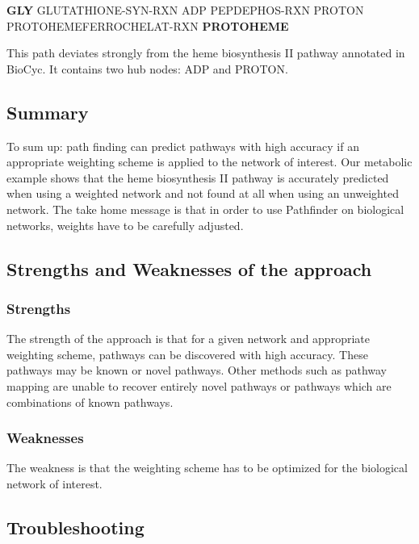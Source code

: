\textbf{GLY} GLUTATHIONE-SYN-RXN ADP PEPDEPHOS-RXN PROTON PROTOHEMEFERROCHELAT-RXN \textbf{PROTOHEME}

This path deviates strongly from the heme biosynthesis II pathway annotated in BioCyc. It contains two hub nodes: ADP and PROTON.

\subsection{Summary}

To sum up: path finding can predict pathways with high accuracy if an appropriate weighting scheme is applied to the network of interest. Our metabolic example shows that the heme biosynthesis II pathway is accurately predicted when using a weighted network and not found at all when using an unweighted network. The take home message is that in order to use Pathfinder on biological networks, weights have to be carefully adjusted.

\subsection{Strengths and Weaknesses of the approach}

\subsubsection{Strengths}
The strength of the approach is that for a given network and appropriate weighting scheme, pathways can be discovered with high accuracy. These pathways may be known or novel pathways. Other methods such as pathway mapping
are unable to recover entirely novel pathways or pathways which are combinations of known pathways.

\subsubsection{Weaknesses}
The weakness is that the weighting scheme has to be optimized for the biological network of interest.

\subsection{Troubleshooting}


